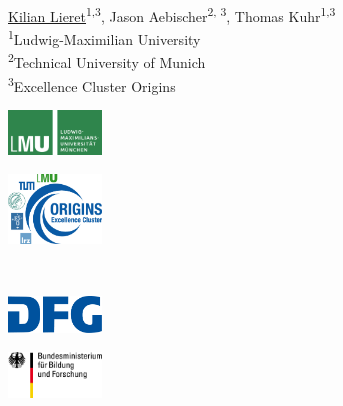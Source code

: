 \begin{frame}{}
	\begin{center}
		{
			{
				
				\Large \inserttitle
			}\\[0.7ex]
			{
				\large \insertsubtitle
			}
		}\\[2ex]
		\underline{Kilian Lieret}\textsuperscript{1,3}, Jason Aebischer\textsuperscript{2, 3}, Thomas Kuhr\textsuperscript{1,3}\\[2ex]
		{
			\footnotesize
			\textsuperscript{1}Ludwig-Maximilian University\\[0ex]
			\textsuperscript{2}Technical University of Munich\\[0ex]
			\vspace{-1ex}\textsuperscript{3}Excellence Cluster Origins
		}\\[2.5ex]
		\insertdate
	\end{center}
	\vspace{2ex}
	\centering
	{
		\begin{minipage}{3cm}
		\includegraphics[width=2.5cm]{figures/logos/lmu_logo.pdf}
		\end{minipage}
	}
	{
		\begin{minipage}{3cm}
			\includegraphics[width=2.5cm]{figures/logos/cluster.pdf}
		\end{minipage}
	}\\[2ex]
	{
		\begin{minipage}{3cm}
			\includegraphics[width=2.5cm]{figures/logos/dfg.pdf}
		\end{minipage}
	}
	{
		\begin{minipage}{3cm}
			\includegraphics[width=2.5cm]{figures/logos/bmbf.pdf}
		\end{minipage}
	}
\end{frame}